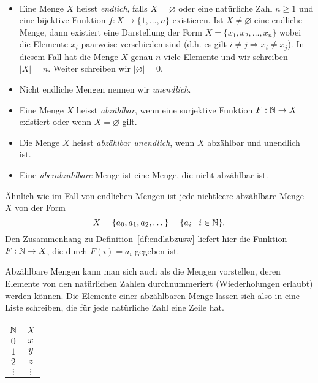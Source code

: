 \begin{df}\label{df:endlabzusw}~
\begin{itemize}
\item Eine Menge $X$ heisst \textit{endlich}, falls $X=\varnothing$ oder eine natürliche Zahl $n\geq 1$ und eine bijektive Funktion $f:X \to \{1,\dots,n\}$ existieren.
Ist $X\neq\varnothing$ eine endliche Menge, dann existiert eine Darstellung der Form $X=\{x_1,x_2,\dots,x_n\}$ wobei die Elemente $x_i$ paarweise verschieden sind (d.h. es gilt $i\neq j\Rightarrow x_i\neq x_j$). In diesem Fall hat die Menge $X$ genau $n$ viele Elemente und wir schreiben $|X|=n$. Weiter schreiben wir $|\varnothing| = 0$.
\item Nicht endliche Mengen nennen wir \textit{unendlich}.
\item Eine Menge $X$ heisst \textit{abzählbar}, wenn eine surjektive Funktion $F:\mathbb{N}\to X$ existiert oder wenn $X=\varnothing$ gilt.
\item Die Menge $X$ heisst \textit{abzählbar unendlich}, wenn $X$ abzählbar und unendlich ist.
\item Eine \textit{überabzählbare} Menge ist eine Menge, die nicht abzählbar ist.
\end{itemize}
\end{df}

\begin{rk}\label{rk:abzMengeAnschauung}
Ähnlich wie im Fall von endlichen Mengen ist jede nichtleere abzählbare Menge $X$ von der Form
\[
X=\{a_0,a_1,a_2,\dots \}=\{a_i\mid i\in\mathbb{N}\}.
\]
Den Zusammenhang zu Definition~\ref{df:endlabzusw} liefert hier die Funktion $F:\mathbb{N}\to X$, die durch $F(i)=a_i$ gegeben ist.
\end{rk}
\begin{rk}
Abzählbare Mengen kann man sich auch als die Mengen vorstellen, deren Elemente von den natürlichen Zahlen durchnummeriert  (Wiederholungen erlaubt) werden können. Die Elemente einer abzählbaren Menge lassen sich also in eine Liste schreiben, die für jede natürliche Zahl eine Zeile hat.
\begin{center}
\begin{tabular}{c|c}
$\mathbb{N}$ & $X$\\
\hline
$0$ & $x$\\
$1$ & $y$\\
$2$ & $z$\\
$\vdots$ & $\vdots$
\end{tabular}
\end{center}
\end{rk}

